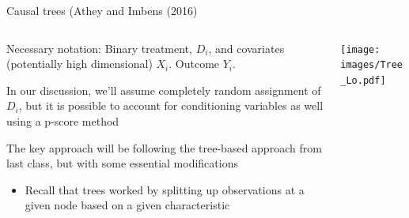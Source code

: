 \documentclass[notes,11pt, aspectratio=169]{beamer}
\newenvironment{wideitemize}{\itemize\addtolength{\itemsep}{10pt}}{\enditemize}
\begin{document}
\begin{frame}{Causal trees (Athey and Imbens (2016)}
    \begin{columns}[onlytextwidth, T] %
      \begin{column}{.5\textwidth}
        \begin{wideitemize}
        \item Necessary notation: Binary treatment, $D_{i}$, and covariates
          (potentially high dimensional) $X_{i}$. Outcome
          $Y_{i}$.
        \item In our discussion, we'll assume completely random assignment
          of $D_{i}$, but it is possible to account for conditioning
          variables as well using a p-score method 
        \item The key approach will be following the tree-based approach from last class, but with some essential modifications
          \begin{itemize}
          \item Recall that trees worked by splitting up observations at a
            given node based on a given characteristic
          \end{itemize}
        \end{wideitemize}
      \end{column}%
      \hfill%
      \begin{column}{.5\textwidth}
        \texttt{[image: images/Tree\_Lo.pdf]}
      \end{column}%
    \end{columns}
\end{frame}
\end{document}
